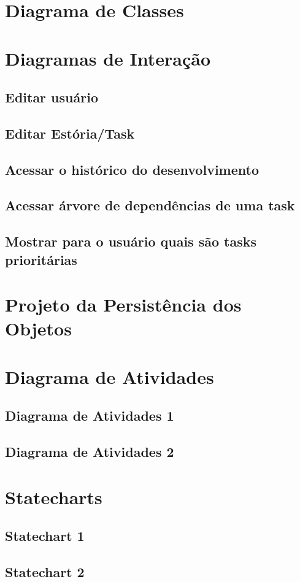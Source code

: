 \documentclass[brazil,times]{abnt}
\begin{document}
\section{Diagrama de Classes}


\section{Diagramas de Interação}
\subsection{Editar usuário}


\subsection{Editar Estória/Task}


\subsection{Acessar o histórico do desenvolvimento}


\subsection{Acessar árvore de dependências de uma task}


\subsection{Mostrar para o usuário quais são tasks prioritárias}


\section{Projeto da Persistência dos Objetos}


\section{Diagrama de Atividades}
\subsection{Diagrama de Atividades 1}


\subsection{Diagrama de Atividades 2}


\section{Statecharts}
\subsection{Statechart 1}


\subsection{Statechart 2}
\end{document}
